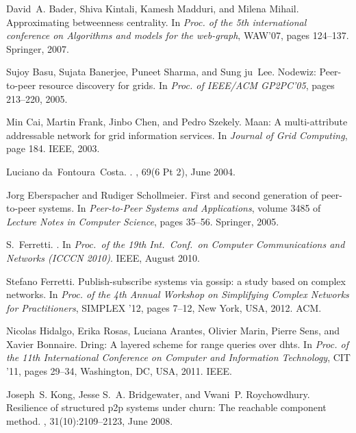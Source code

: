 \documentclass{www13-companion-accepted}
\begin{document}
\begin{thebibliography}{10}

David~A. Bader, Shiva Kintali, Kamesh Madduri, and Milena Mihail.
\newblock Approximating betweenness centrality.
\newblock In {\em Proc. of the 5th international conference on Algorithms and
  models for the web-graph}, WAW'07, pages 124--137. Springer, 2007.

Sujoy Basu, Sujata Banerjee, Puneet Sharma, and Sung ju~Lee.
\newblock Nodewiz: Peer-to-peer resource discovery for grids.
\newblock In {\em Proc. of IEEE/ACM GP2PC’05}, pages 213--220, 2005.

Min Cai, Martin Frank, Jinbo Chen, and Pedro Szekely.
\newblock Maan: A multi-attribute addressable network for grid information
  services.
\newblock In {\em Journal of Grid Computing}, page 184. IEEE, 2003.

Luciano da~Fontoura~Costa.
.
, 69(6 Pt 2), June 2004.

Jorg Eberspacher and Rudiger Schollmeier.
\newblock First and second generation of peer-to-peer systems.
\newblock In {\em Peer-to-Peer Systems and Applications}, volume 3485 of {\em
  Lecture Notes in Computer Science}, pages 35--56. Springer, 2005.

S.~Ferretti.
.
\newblock In {\em Proc.~of the 19th Int.~Conf.~on Computer Communications and
  Networks (ICCCN 2010)}. IEEE, August 2010.

Stefano Ferretti.
\newblock Publish-subscribe systems via gossip: a study based on complex
  networks.
\newblock In {\em Proc. of the 4th Annual Workshop on Simplifying Complex
  Networks for Practitioners}, SIMPLEX '12, pages 7--12, New York, USA, 2012.
  ACM.

Nicolas Hidalgo, Erika Rosas, Luciana Arantes, Olivier Marin, Pierre Sens, and
  Xavier Bonnaire.
\newblock Dring: A layered scheme for range queries over dhts.
\newblock In {\em Proc. of the 11th International Conference on Computer and
  Information Technology}, CIT '11, pages 29--34, Washington, DC, USA, 2011.
  IEEE.

Joseph~S. Kong, Jesse S.~A. Bridgewater, and Vwani~P. Roychowdhury.
\newblock Resilience of structured p2p systems under churn: The reachable
  component method.
, 31(10):2109--2123, June 2008.


\end{thebibliography}
\end{document}
